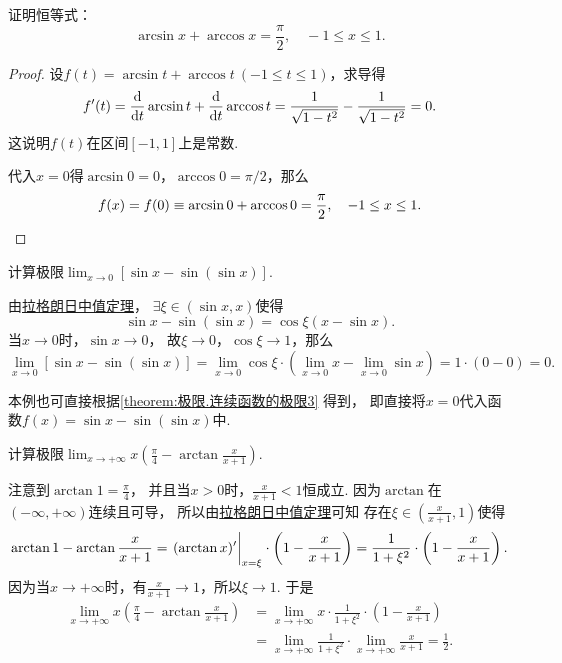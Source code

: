 \begin{example}
证明恒等式：\[
	\arcsin x + \arccos x = \frac{\pi}{2},
	\quad -1 \leq x \leq 1.
\]
\begin{proof}
设\(f(t) = \arcsin t + \arccos t\ (-1 \leq t \leq 1)\)，求导得\[
	f'(t) = \dv{t} \arcsin t + \dv{t} \arccos t
	= \frac{1}{\sqrt{1-t^2}} - \frac{1}{\sqrt{1-t^2}} = 0.
\]
这说明\(f(t)\)在区间\([-1,1]\)上是常数.

代入\(x=0\)得\(\arcsin 0 = 0\)，\(\arccos 0 = \pi/2\)，那么\[
	f(x) = f(0) \equiv \arcsin 0 + \arccos 0 = \frac{\pi}{2},
	\quad -1 \leq x \leq 1.
	\qedhere
\]
\end{proof}
\end{example}

\begin{example}
计算极限\(\lim_{x\to0} \left[\sin x - \sin(\sin x)\right]\).
\begin{solution}
由\hyperref[theorem:微分中值定理.拉格朗日中值定理]{拉格朗日中值定理}，
\(\exists\xi\in(\sin x,x)\)使得\[
	\sin x - \sin(\sin x)
	= \cos\xi (x-\sin x).
\]
当\(x\to0\)时，\(\sin x\to0\)，
故\(\xi\to0\)，\(\cos\xi\to1\)，那么\[
	\lim_{x\to0} \left[\sin x - \sin(\sin x)\right]
	= \lim_{x\to0} \cos\xi \cdot
		\left(\lim_{x\to0} x - \lim_{x\to0} \sin x\right)
	= 1 \cdot (0-0) = 0.
\]
\end{solution}
\end{example}
本例也可直接根据\cref{theorem:极限.连续函数的极限3} 得到，
即直接将\(x=0\)代入函数\(f(x) = \sin x - \sin(\sin x)\)中.
\begin{example}%
计算极限\(\lim_{x\to+\infty} x \left( \frac\pi4 - \arctan\frac{x}{x+1} \right)\).
\begin{solution}
注意到\(\arctan1 = \frac\pi4\)，
并且当\(x>0\)时，\(\frac{x}{x+1} < 1\)恒成立.
因为\(\arctan\)在\((-\infty,+\infty)\)连续且可导，
所以由\hyperref[theorem:微分中值定理.拉格朗日中值定理]{拉格朗日中值定理}可知
存在\(\xi\in\left( \frac{x}{x+1},1 \right)\)使得\[
	\arctan1 - \arctan\frac{x}{x+1}
	= \eval{(\arctan x)'}_{x=\xi} \cdot \left( 1 - \frac{x}{x+1} \right)
	= \frac1{1+\xi^2} \cdot \left( 1 - \frac{x}{x+1} \right).
\]
因为当\(x\to+\infty\)时，有\(\frac{x}{x+1} \to 1\)，所以\(\xi \to 1\).
于是\begin{align*}
	\lim_{x\to+\infty} x \left( \frac\pi4 - \arctan\frac{x}{x+1} \right)
	&= \lim_{x\to+\infty} x
		\cdot \frac1{1+\xi^2}
		\cdot \left( 1 - \frac{x}{x+1} \right) \\
	&= \lim_{x\to+\infty} \frac1{1+\xi^2}
		\cdot \lim_{x\to+\infty} \frac{x}{x+1}
	= \frac12.
\end{align*}
\end{solution}
\end{example}
